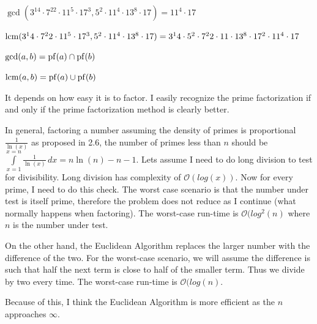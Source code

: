 \item \(\gcd(3^14 \cdot 7^22 \cdot 11^5 \cdot 17^3, 5^2 \cdot 11^4 \cdot 13^8 \cdot 17) = 11^4 \cdot 17\)

\item \(\mathrm{lcm} (3^14 \cdot 7^22 \cdot 11^5 \cdot 17^3, 5^2 \cdot 11^4 \cdot 13^8 \cdot 17) = 3^14 \cdot 5^2 \cdot 7^22 \cdot 11 \cdot 13^8 \cdot 17^2 \cdot 11^4 \cdot 17\)

\item \(\gcd(a, b) = \mathrm{pf}(a) \cap \mathrm{pf}(b)\)

\(\mathrm{lcm}(a, b) = \mathrm{pf}(a) \cup \mathrm{pf}(b)\)

\item It depends on how easy it is to factor. I easily recognize the prime factorization if and only if the prime factorization method is clearly better.

In general, factoring a number assuming the density of primes is proportional \(\frac{1}{\ln(x)}\) as proposed in 2.6, the number of primes less than \(n\) should be \(\int \limits_{x=1}^{x=n} \frac{1}{\ln(x)} \, dx = n \ln(n) - n - 1 \). Lets assume I need to do long division to test for divisibility. Long division has complexity of \(\mathcal{O}(log(x))\). Now for every prime, I need to do this check. The worst case scenario is that the number under test is itself prime, therefore the problem does not reduce as I continue (what normally happens when factoring). The worst-case run-time is \(\mathcal{O}(log^2(n)\) where \(n\) is the number under test.

On the other hand, the Euclidean Algorithm replaces the larger number with the difference of the two. For the worst-case scenario, we will assume the difference is such that half the next term is close to half of the smaller term. Thus we divide by two every time. The worst-case run-time is \(\mathcal{O}(log(n)\).

Because of this, I think the Euclidean Algorithm is more efficient as the $n$ approaches $\infty$.

\item 


